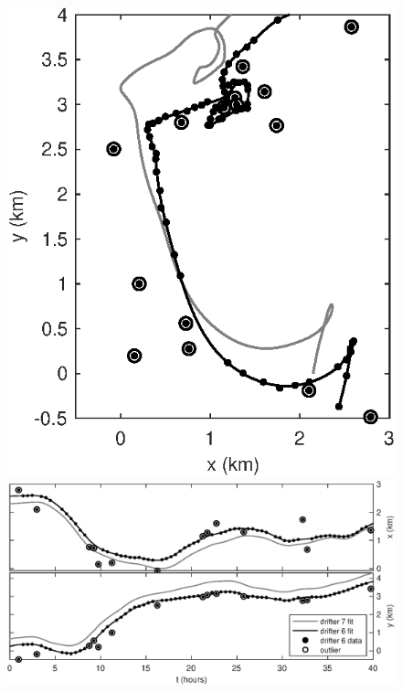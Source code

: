 \documentclass[10pt,journal]{IEEEtran}
\begin{document}
\begin{figure}[t]
  \centering
    \begin{minipage}{0.35\textwidth}
        \centering
        \includegraphics[width=1.0\textwidth]{figures/gpsfit_xy} %
    \end{minipage}\hfill
    \begin{minipage}{0.65\textwidth}
        \centering
        \includegraphics[width=1.0\textwidth]{figures/gpsfit_xtyt} %
    \end{minipage}
  
  \label{gpsfit}
\end{figure}
\end{document}
